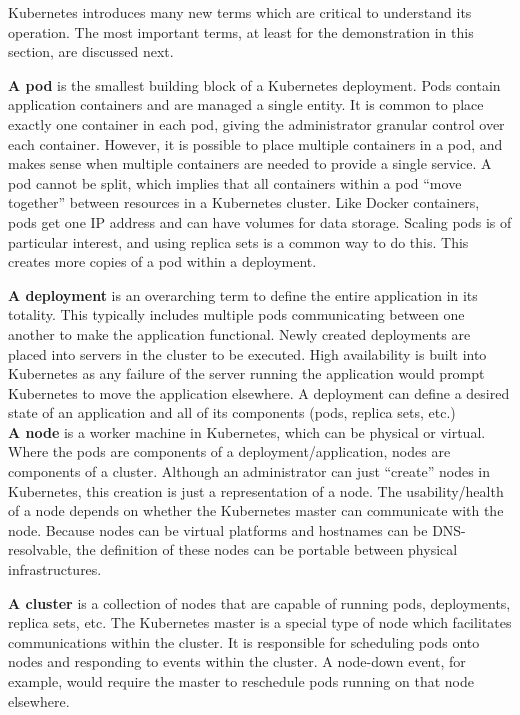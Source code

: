 Kubernetes introduces many new terms which are critical to understand its
operation. The most important terms, at least for the demonstration in this
section, are discussed next.

\textbf{A pod} is the smallest building block of a Kubernetes deployment. Pods
contain application containers and are managed a single entity. It is common
to place exactly one container in each pod, giving the administrator granular
control over each container. However, it is possible to place multiple
containers in a pod, and makes sense when multiple containers are needed to
provide a single service. A pod cannot be split, which implies that all
containers within a pod ``move together'' between resources in a Kubernetes
cluster. Like Docker containers, pods get one IP address and can have volumes
for data storage. Scaling pods is of particular interest, and using replica
sets is a common way to do this. This creates more copies of a pod within a
deployment.

\textbf{A deployment} is an overarching term to define the entire application
in its totality. This typically includes multiple pods communicating between
one another to make the application functional. Newly created deployments are
placed into servers in the cluster to be executed. High availability is built
into Kubernetes as any failure of the server running the application would
prompt Kubernetes to move the application elsewhere. A deployment can define a
desired state of an application and all of its components (pods, replica sets,
etc.) \\

\textbf{A node} is a worker machine in Kubernetes, which can be physical or
virtual. Where the pods are components of a deployment/application, nodes are
components of a cluster. Although an administrator can just ``create'' nodes in
Kubernetes, this creation is just a representation of a node. The
usability/health of a node depends on whether the Kubernetes master can
communicate with the node. Because nodes can be virtual platforms and
hostnames can be DNS-resolvable, the definition of these nodes can be portable
between physical infrastructures.

\textbf{A cluster} is a collection of nodes that are capable of running pods,
deployments, replica sets, etc. The Kubernetes master is a special type of
node which facilitates communications within the cluster. It is responsible
for scheduling pods onto nodes and responding to events within the cluster. A
node-down event, for example, would require the master to reschedule pods
running on that node elsewhere.

